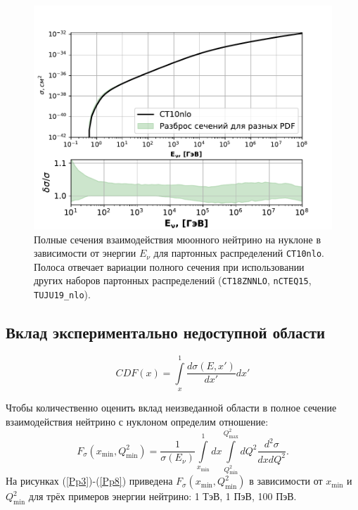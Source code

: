 \begin{figure}[!h]
\centering
\includegraphics[width=\linewidth]{images/NuProp/xs_vs_enu.pdf}
\caption{Полные сечения взаимодействия мюонного нейтрино на нуклоне в зависимости от энергии $E_\nu$ для партонных распределений \texttt{CT10nlo}. Полоса отвечает вариации полного сечения при использовании других наборов партонных распределений (\texttt{CT18ZNNLO}, \texttt{nCTEQ15}, \texttt{TUJU19\_nlo}).} 
\label{fig:xsec_total}
\end{figure}

\subsection{Вклад экспериментально недоступной области}

\begin{equation}
CDF(x) = \int\limits_{x}^1\frac{d\sigma(E,x')}{dx'}dx'
\end{equation}


Чтобы количественно оценить вклад неизведанной области в полное сечение взаимодействия нейтрино с нуклоном  определим отношение: 
 \begin{equation}
     F_{\sigma}(x_\text{min},Q^2_\text{min}) = \frac{1}{\sigma(E_{\nu})}\int\limits_{x_\text{min}}^1dx\int\limits_{Q^2_\text{min}}^{Q^2_\text{max}}dQ^2\frac{d^2\sigma}{dxdQ^2}.
 \end{equation}
На рисунках (\ref{Pp3})-(\ref{Pp8}) приведена $F_{\sigma}(x_\text{min},Q^2_\text{min})$ в зависимости от $x_\text{min}$ и $Q^2_\text{min}$ для трёх примеров энергии нейтрино: 1 ТэВ, 1 ПэВ, 100 ПэВ. 
 
